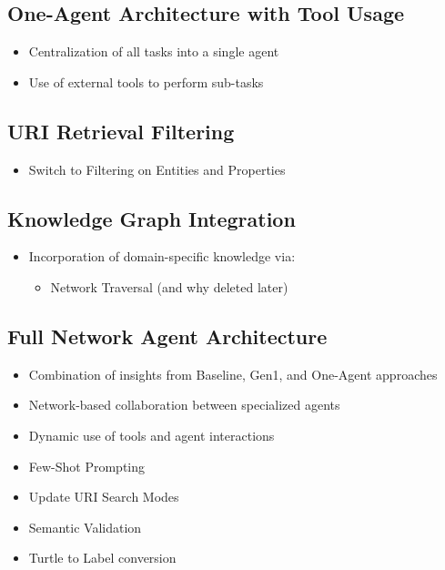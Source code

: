 \documentclass[a4paper,oneside,bibliography=totoc]{scrbook}
\begin{document}
\subsection{One-Agent Architecture with Tool Usage}
\label{subsec:one_agent_architecture_tool_usage}
\begin{itemize}
  \item Centralization of all tasks into a single agent
  \item Use of external tools to perform sub-tasks
\end{itemize}

\subsection{URI Retrieval Filtering}
\label{subsec:uri_retrieval_filtering}
\begin{itemize}
  \item Switch to Filtering on Entities and Properties
\end{itemize}

\subsection{Knowledge Graph Integration}
\label{subsec:knowledge_graph_integration}
\begin{itemize}
  \item Incorporation of domain-specific knowledge via:
        \begin{itemize}
          \item Network Traversal (and why deleted later)

        \end{itemize}
\end{itemize}

\subsection{Full Network Agent Architecture}
\label{subsec:full_network_agent_architecture}
\begin{itemize}
  \item Combination of insights from Baseline, Gen1, and One-Agent approaches
  \item Network-based collaboration between specialized agents
  \item Dynamic use of tools and agent interactions
  \item Few-Shot Prompting
  \item Update URI Search Modes
  \item Semantic Validation
  \item Turtle to Label conversion
\end{itemize}
\end{document}
